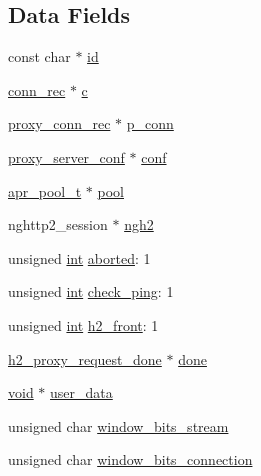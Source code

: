 \subsection*{Data Fields}
\begin{DoxyCompactItemize}
\item 
const char $\ast$ \hyperlink{structh2__proxy__session_ae67274346c5ae772de78d93a5707a5f6}{id}
\item 
\hyperlink{structconn__rec}{conn\+\_\+rec} $\ast$ \hyperlink{structh2__proxy__session_ac79a04ae92b3cf7a34b4c251bbb9a551}{c}
\item 
\hyperlink{structproxy__conn__rec}{proxy\+\_\+conn\+\_\+rec} $\ast$ \hyperlink{structh2__proxy__session_a51b4f90ddb1f230094059fba5f44d7b5}{p\+\_\+conn}
\item 
\hyperlink{structproxy__server__conf}{proxy\+\_\+server\+\_\+conf} $\ast$ \hyperlink{structh2__proxy__session_ac1a68e13ab0ddbfb4ff664cf285281b9}{conf}
\item 
\hyperlink{structapr__pool__t}{apr\+\_\+pool\+\_\+t} $\ast$ \hyperlink{structh2__proxy__session_afc51ecbd2b58959c21fc7e31d17878ea}{pool}
\item 
nghttp2\+\_\+session $\ast$ \hyperlink{structh2__proxy__session_ae5281df3b5d25fe3628d8b1efcfa1b70}{ngh2}
\item 
unsigned \hyperlink{pcre_8txt_a42dfa4ff673c82d8efe7144098fbc198}{int} \hyperlink{structh2__proxy__session_af89e350dd79ea92356f89664607b61b9}{aborted}\+: 1
\item 
unsigned \hyperlink{pcre_8txt_a42dfa4ff673c82d8efe7144098fbc198}{int} \hyperlink{structh2__proxy__session_aab9d08ed258a6d49ed18a3d4335aeee6}{check\+\_\+ping}\+: 1
\item 
unsigned \hyperlink{pcre_8txt_a42dfa4ff673c82d8efe7144098fbc198}{int} \hyperlink{structh2__proxy__session_a41cb62e1cf2d92ecac35850fcfb4ecde}{h2\+\_\+front}\+: 1
\item 
\hyperlink{h2__proxy__session_8h_ab03f2c17fec6ec68916d7cf8a91efd54}{h2\+\_\+proxy\+\_\+request\+\_\+done} $\ast$ \hyperlink{structh2__proxy__session_a4dd756bee1ad8bab34e7ab2c5232309d}{done}
\item 
\hyperlink{group__MOD__ISAPI_gacd6cdbf73df3d9eed42fa493d9b621a6}{void} $\ast$ \hyperlink{structh2__proxy__session_a76544c3bbeb76dce903bec5d9930ffa0}{user\+\_\+data}
\item 
unsigned char \hyperlink{structh2__proxy__session_a883566eeb6fdb2f49d9731da9a9e367c}{window\+\_\+bits\+\_\+stream}
\item 
unsigned char \hyperlink{structh2__proxy__session_ad3a2795431b54a9437c79fad5b40fb45}{window\+\_\+bits\+\_\+connection}

\end{DoxyCompactItemize}
